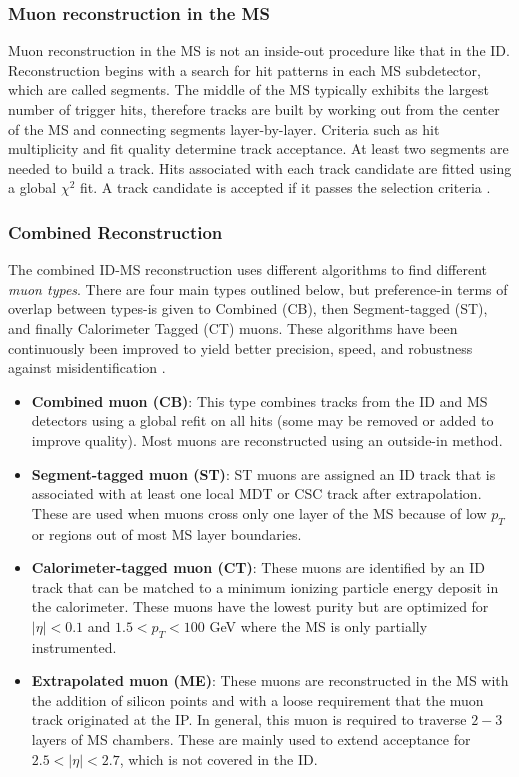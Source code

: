 \subsubsection{Muon reconstruction in the MS}
Muon reconstruction in the MS is not an inside-out procedure like that in the ID. Reconstruction begins with a search for hit patterns in each MS subdetector, which are called segments. The middle of the MS typically exhibits the largest number of trigger hits, therefore tracks are built by working out from the center of the MS and connecting segments layer-by-layer. Criteria such as hit multiplicity and fit quality determine track acceptance. At least two segments are needed to build a track. Hits associated with each track candidate are fitted using a global $\chi^2$ fit. A track candidate is accepted if it passes the selection criteria \cite{ICreconstruction}. 

\subsubsection{Combined Reconstruction}
The combined ID-MS reconstruction uses different algorithms to find different \textit{muon types}. There are four main types outlined below, but preference-in terms of overlap between types-is given to Combined (CB), then Segment-tagged (ST), and finally Calorimeter Tagged (CT) muons. These algorithms have been continuously been improved to yield better precision, speed, and robustness against misidentification \cite{MCPpaper}.  

\begin{itemize}
\item \textbf{Combined muon (CB)}: This type combines tracks from the ID and MS detectors using a global refit on all hits (some may be removed or added to improve quality). Most muons are reconstructed using an outside-in method. 
\item \textbf{Segment-tagged muon (ST)}: ST muons are assigned an ID track that is associated with at least one local MDT or CSC track after extrapolation. These are used when muons cross only one layer of the MS because of low $p_T$ or regions out of most MS layer boundaries. 
\item \textbf{Calorimeter-tagged muon (CT)}: These muons are identified by an ID track that can be matched to a minimum ionizing particle energy deposit in the calorimeter. These muons have the lowest purity but are optimized for $|\eta|  < 0.1$ and $1.5 < p_T < 100$ GeV where the MS is only partially instrumented. 
\item \textbf{Extrapolated muon (ME)}: These muons are reconstructed in the MS with the addition of silicon points and with a loose requirement that the muon track originated at the IP. In general, this muon is required to traverse $2-3$ layers of MS chambers. These are mainly used to extend acceptance for $2.5 < |\eta| < 2.7$, which is not covered in the ID. 
\end{itemize}

